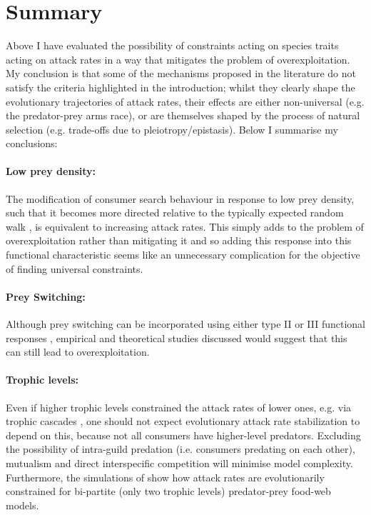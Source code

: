 \documentclass[a4paper]{report}
\begin{document}
\section{Summary}

Above I have evaluated the possibility of constraints acting on species traits acting on attack rates in a way that mitigates the problem of overexploitation. My conclusion is that some of the mechanisms proposed in the literature do not satisfy the criteria highlighted in the introduction; whilst they clearly shape the evolutionary trajectories of attack rates, their effects are either non-universal (e.g. the predator-prey arms race), or are themselves shaped by the process of natural selection (e.g. trade-offs due to pleiotropy/epistasis). Below I summarise my conclusions:\\

\paragraph{Low prey density:} The modification of consumer search behaviour in response to low prey density, such that it becomes more directed relative to the typically expected random walk \citep{Humphries2010}, is equivalent to increasing attack rates. This simply adds to the problem of overexploitation rather than mitigating it and so adding this response into this functional characteristic seems like an unnecessary complication for the objective of finding universal constraints.\\

\paragraph{Prey Switching:} Although prey switching can be incorporated using either type II or III functional responses \citep{Holling1959}, empirical \citep{MAtter2005} and theoretical \citep{Abrams2003} studies discussed would suggest that this can still lead to overexploitation.\\

\paragraph{Trophic levels:} Even if higher trophic levels constrained the attack rates of lower ones, e.g. via trophic cascades \citep{heath2014}, one should not expect evolutionary attack rate stabilization to depend on this, because not all consumers have higher-level predators. Excluding the possibility of intra-guild predation (i.e. consumers predating on each other), mutualism and direct interspecific competition will minimise model complexity. Furthermore, the simulations of \citep{Rossberg2008} show how attack rates are evolutionarily constrained for bi-partite (only two trophic levels) predator-prey food-web models.\\
\end{document}
